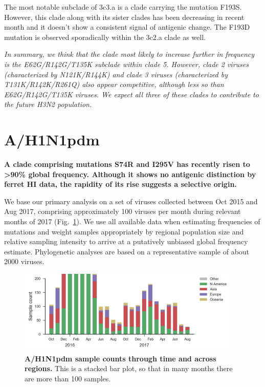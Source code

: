 \documentclass[11pt,oneside,letterpaper]{article}
\newcommand{\FIG}[1]{Fig.~\ref{#1}}
\begin{document}
The most notable subclade of 3c3.a is a clade carrying the mutation
F193S. However, this clade along with its sister clades has been
decreasing in recent month and it doesn't show a consistent signal of
antigenic change. The F193D mutation is observed sporadically within
the 3c2.a clade as well.


\textit{In summary, we think that the clade most likely to increase further in frequency is the E62G/R142G/T135K subclade within clade 5.
However, clade 2 viruses (characterized by N121K/R144K) and clade 3 viruses (characterized by T131K/R142K/R261Q) also appear competitive, although less so than E62G/R142G/T135K viruses.
We expect all three of these clades to contribute to the future H3N2 population.}


\clearpage
\section*{A/H1N1pdm}

\textbf{A clade comprising mutations S74R and I295V has recently risen
to \textgreater{}90\% global frequency. Although it shows no antigenic
distinction by ferret HI data, the rapidity of its rise suggests a
selective origin.}

We base our primary analysis on a set of viruses collected between Oct
2015 and Aug 2017, comprising approximately 100 viruses per month during
relevant months of 2017 (\FIG{h1n1pdm_counts}). We use all available data when estimating
frequencies of mutations and weight samples appropriately by regional
population size and relative sampling intensity to arrive at a
putatively unbiased global frequency estimate. Phylogenetic analyses are
based on a representative sample of about 2000 viruses.

\begin{figure}[H]
  \centering
  \includegraphics[width=0.95\textwidth]{../figures/sep-2017/h1n1pdm_counts.png}
  \caption{\textbf{A/H1N1pdm sample counts through time and across regions.}
  This is a stacked bar plot, so that in many months there are more than 100 samples.
  }
  \label{h1n1pdm_counts}
\end{figure}
\end{document}
